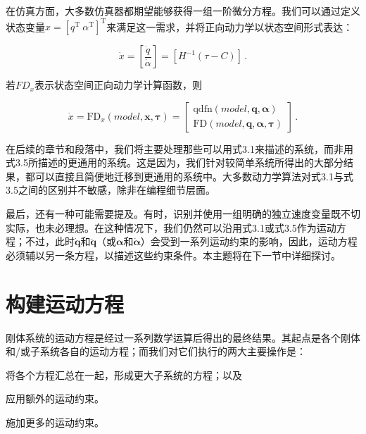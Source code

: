 \documentclass[10pt,a4paper]{book}
\theoremstyle{thmstyle} %
\theoremstyle{defstyle} %
\theoremstyle{prostyle} %
\begin{document}
在仿真方面，大多数仿真器都期望能够获得一组一阶微分方程。我们可以通过定义状态变量$x = [q^{\text{T}} \ \alpha^{\text{T}}]^{\text{T}}$来满足这一需求，并将正向动力学以状态空间形式表达：



$$
\dot { x } = \left[ \frac { \dot { q } } { \dot { \alpha } } \right] = \left[ H ^{- 1} ( \tau - C ) \right] \, .
$$



若$FD_{x}$表示状态空间正向动力学计算函数，则



$$
\dot { x } = \mathrm { F D } _ { x } ( m o d e l , \boldsymbol{ x } , \boldsymbol{ \tau } ) = \left[ \begin{array}{l} { \mathrm { q d f n } ( m o d e l , \boldsymbol{ q } , \boldsymbol{ \alpha } ) } \\{ \mathrm { F D } ( m o d e l , \boldsymbol{ q } , \boldsymbol{ \alpha } , \boldsymbol{ \tau } ) } \end{array} \right] \, .
$$



在后续的章节和段落中，我们将主要处理那些可以用式3.1来描述的系统，而非用式3.5所描述的更通用的系统。这是因为，我们针对较简单系统所得出的大部分结果，都可以直接且简便地迁移到更通用的系统中。大多数动力学算法对式3.1与式3.5之间的区别并不敏感，除非在编程细节层面。



最后，还有一种可能需要提及。有时，识别并使用一组明确的独立速度变量既不切实际，也未必理想。在这种情况下，我们仍然可以沿用式3.1或式3.5作为运动方程；不过，此时$\dot{\boldsymbol{q}}$和$\ddot{\boldsymbol{q}}$（或$\boldsymbol{\alpha}$和$\dot{\boldsymbol{\alpha}}$）会受到一系列运动约束的影响，因此，运动方程必须辅以另一条方程，以描述这些约束条件。本主题将在下一节中详细探讨。



\section{构建运动方程}





刚体系统的运动方程是经过一系列数学运算后得出的最终结果。其起点是各个刚体和/或子系统各自的运动方程；而我们对它们执行的两大主要操作是：



将各个方程汇总在一起，形成更大子系统的方程；以及

应用额外的运动约束。

施加更多的运动约束。
\end{document}
